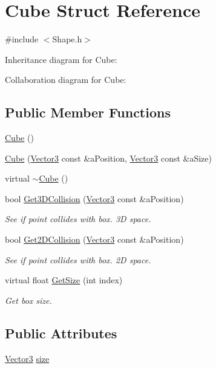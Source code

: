 \hypertarget{structCube}{}\section{Cube Struct Reference}
\label{structCube}


{\ttfamily \#include $<$Shape.\+h$>$}



Inheritance diagram for Cube\+:


Collaboration diagram for Cube\+:
\subsection*{Public Member Functions}
\begin{DoxyCompactItemize}
\item 
\hyperlink{structCube_a06f3d86fb63e3aad08623610aa3c17b4}{Cube} ()
\item 
\hyperlink{structCube_a58c799a411212a2f63212e9b37264374}{Cube} (\hyperlink{structVector3}{Vector3} const \&a\+Position, \hyperlink{structVector3}{Vector3} const \&a\+Size)
\item 
virtual \hyperlink{structCube_aa814e979cecb8c451fdb332ded2cea1e}{$\sim$\+Cube} ()
\item 
bool \hyperlink{structCube_a5207b932fcb634dc6cf501bf672fb320}{Get3\+D\+Collision} (\hyperlink{structVector3}{Vector3} const \&a\+Position)
\begin{DoxyCompactList}\small\item\em See if point collides with box. 3D space. \end{DoxyCompactList}\item 
bool \hyperlink{structCube_a479cf616ed314115f48b5d971d10f72c}{Get2\+D\+Collision} (\hyperlink{structVector3}{Vector3} const \&a\+Position)
\begin{DoxyCompactList}\small\item\em See if point collides with box. 2D space. \end{DoxyCompactList}\item 
virtual float \hyperlink{structCube_a29ac05ab7f85061d15fe55b93c7893ea}{Get\+Size} (int index)
\begin{DoxyCompactList}\small\item\em Get box size. \end{DoxyCompactList}\end{DoxyCompactItemize}
\subsection*{Public Attributes}
\begin{DoxyCompactItemize}
\item 
\hyperlink{structVector3}{Vector3} \hyperlink{structCube_af91da7f2921064967c74866ad76abce2}{size}
\end{DoxyCompactItemize}
